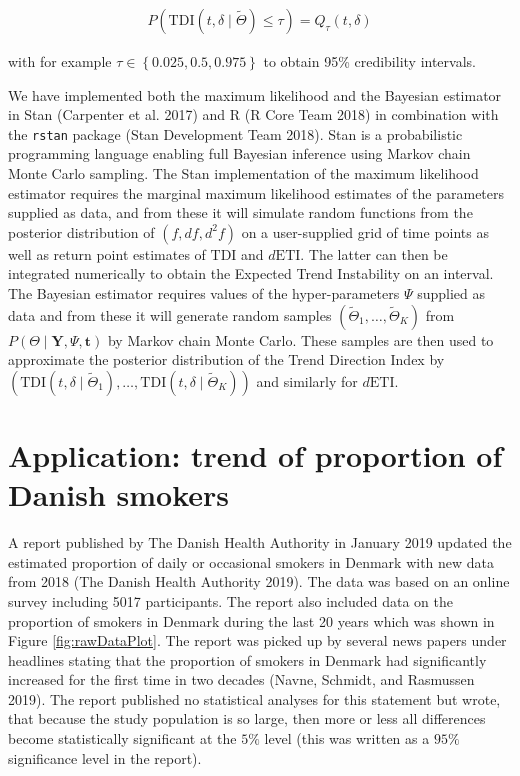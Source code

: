 \documentclass[11pt,]{article}
\theoremstyle{nonumberplain}
\begin{document}
\begin{align*}
  P\left(\mathrm{TDI}\left(t, \delta \mid \widetilde{\Theta}\right) \leq \tau\right) = Q_\tau(t, \delta)
\end{align*}

with for example \(\tau \in \left\{0.025, 0.5, 0.975\right\}\) to obtain
95\% credibility intervals.

We have implemented both the maximum likelihood and the Bayesian
estimator in Stan (Carpenter et al. 2017) and R (R Core Team 2018) in
combination with the \texttt{rstan} package (Stan Development Team
2018). Stan is a probabilistic programming language enabling full
Bayesian inference using Markov chain Monte Carlo sampling. The Stan
implementation of the maximum likelihood estimator requires the marginal
maximum likelihood estimates of the parameters supplied as data, and
from these it will simulate random functions from the posterior
distribution of \((f, df, d^2\!f)\) on a user-supplied grid of time
points as well as return point estimates of \(\mathrm{TDI}\) and
\(d\mathrm{ETI}\). The latter can then be integrated numerically to
obtain the Expected Trend Instability on an interval. The Bayesian
estimator requires values of the hyper-parameters \(\Psi\) supplied as
data and from these it will generate random samples
\((\widetilde{\Theta}_1, \ldots, \widetilde{\Theta}_K)\) from
\(P(\Theta \mid \mathbf{Y}, \Psi, \mathbf{t})\) by Markov chain Monte
Carlo. These samples are then used to approximate the posterior
distribution of the Trend Direction Index by
\((\mathrm{TDI}(t, \delta \mid \widetilde{\Theta}_1), \ldots, \mathrm{TDI}(t, \delta \mid \widetilde{\Theta}_K))\)
and similarly for \(d\mathrm{ETI}\).

\section{Application: trend of proportion of Danish
smokers}\label{sec:application}

A report published by The Danish Health Authority in January 2019
updated the estimated proportion of daily or occasional smokers in
Denmark with new data from 2018 (The Danish Health Authority 2019). The
data was based on an online survey including 5017 participants. The
report also included data on the proportion of smokers in Denmark during
the last 20 years which was shown in Figure \ref{fig:rawDataPlot}. The
report was picked up by several news papers under headlines stating that
the proportion of smokers in Denmark had significantly increased for the
first time in two decades (Navne, Schmidt, and Rasmussen 2019). The
report published no statistical analyses for this statement but wrote,
that because the study population is so large, then more or less all
differences become statistically significant at the \(5\%\) level (this
was written as a \(95\%\) significance level in the report).
\end{document}
